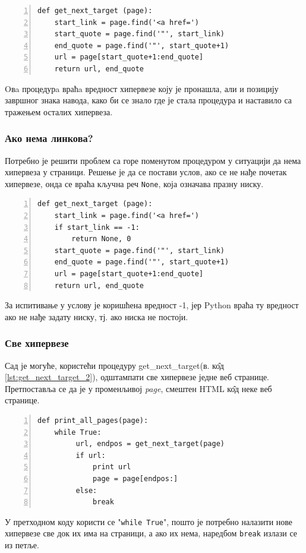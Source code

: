 \begin{lstlisting}[caption= Процедура налажења прве следеће хипервезе, label={lst:get_next_target_1}, numbers = left]
def get_next_target (page):
    start_link = page.find('<a href=')
    start_quote = page.find('"', start_link)
    end_quote = page.find('"', start_quote+1)
    url = page[start_quote+1:end_quote]
    return url, end_quote
\end{lstlisting}

Oвa процедурa враћa вредност хипервезе коју је пронашла, али и позицију завршног знака навода, како би се знало где је стала процедура и наставило са тражењем осталих хипервеза.

\subsubsection{Ако нема линкова?}

Потребно је решити проблем са горе поменутом процедуром у ситуацији да нема хипервеза у страници. Решење је да се постави услов, ако се не нађе почетак хипервезе, онда се враћа кључна реч \lstinline{None}, која означава празну ниску.

\begin{lstlisting}[caption = Испитивање да ли страница садржи хипервезу, label={lst:get_next_target_2}, numbers = left]
def get_next_target (page):
    start_link = page.find('<a href=')
    if start_link == -1:
        return None, 0
    start_quote = page.find('"', start_link)
    end_quote = page.find('"', start_quote+1)
    url = page[start_quote+1:end_quote]
    return url, end_quote
\end{lstlisting}

За испитивање у услову је коришћена вредност -1, јер Python враћа ту вредност ако не нађе задату ниску, тј. ако ниска не постоји.

\subsubsection{Све хипервезе}		Сад је могуће, користећи процедуру get\_next\_target(в. к\^{о}д \ref{lst:get_next_target_2}), одштампати све хипервезе једне веб странице. Претпоставља се да је у променљивој \emph{page}, смештен HTML к\^{о}д неке веб странице.

\begin{lstlisting}[caption=Процедура штампања свих хипервеза, label={lst:print_all_links}, numbers = left	]
def print_all_pages(page):
    while True:
         url, endpos = get_next_target(page)
         if url:
             print url
             page = page[endpos:]
         else:
             break
\end{lstlisting}

У претходном коду користи се "\lstinline{while True}", пошто је потребно налазити нове хипервезе све док их има на страници, а ако их нема, наредбом \lstinline{break} излази се из петље.
